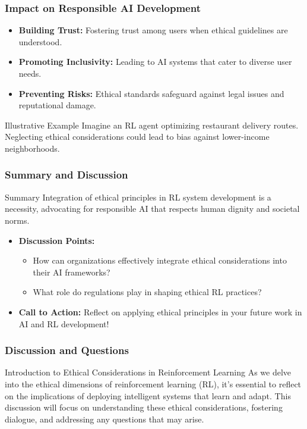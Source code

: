 \documentclass{beamer}
\begin{document}
\begin{frame}[fragile]
    \frametitle{Impact on Responsible AI Development}

    \begin{itemize}
        \item \textbf{Building Trust:} Fostering trust among users when ethical guidelines are understood.
        \item \textbf{Promoting Inclusivity:} Leading to AI systems that cater to diverse user needs.
        \item \textbf{Preventing Risks:} Ethical standards safeguard against legal issues and reputational damage.
    \end{itemize}

    \begin{block}{Illustrative Example}
        Imagine an RL agent optimizing restaurant delivery routes. Neglecting ethical considerations could lead to bias against lower-income neighborhoods.
    \end{block}
\end{frame}

\begin{frame}[fragile]
    \frametitle{Summary and Discussion}

    \begin{block}{Summary}
        Integration of ethical principles in RL system development is a necessity, advocating for responsible AI that respects human dignity and societal norms.
    \end{block}

    \begin{itemize}
        \item \textbf{Discussion Points:}
            \begin{itemize}
                \item How can organizations effectively integrate ethical considerations into their AI frameworks?
                \item What role do regulations play in shaping ethical RL practices?
            \end{itemize}
        \item \textbf{Call to Action:} Reflect on applying ethical principles in your future work in AI and RL development!
    \end{itemize}
\end{frame}

\begin{frame}[fragile]
    \frametitle{Discussion and Questions}
    \begin{block}{Introduction to Ethical Considerations in Reinforcement Learning}
        As we delve into the ethical dimensions of reinforcement learning (RL), it's essential to reflect on the implications of deploying intelligent systems that learn and adapt. This discussion will focus on understanding these ethical considerations, fostering dialogue, and addressing any questions that may arise.
    \end{block}
\end{frame}
\end{document}
